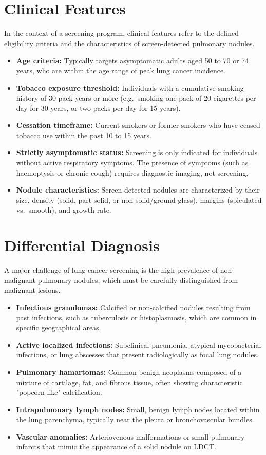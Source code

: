 \section*{Clinical Features}
In the context of a screening program, clinical features refer to the defined eligibility criteria and the characteristics of screen-detected pulmonary nodules.
\begin{itemize}
    \item \textbf{Age criteria:} Typically targets asymptomatic adults aged 50 to 70 or 74 years, who are within the age range of peak lung cancer incidence.
    \item \textbf{Tobacco exposure threshold:} Individuals with a cumulative smoking history of 30 pack-years or more (e.g.\ smoking one pack of 20 cigarettes per day for 30 years, or two packs per day for 15 years).
    \item \textbf{Cessation timeframe:} Current smokers or former smokers who have ceased tobacco use within the past 10 to 15 years.
    \item \textbf{Strictly asymptomatic status:} Screening is only indicated for individuals without active respiratory symptoms. The presence of symptoms (such as haemoptysis or chronic cough) requires diagnostic imaging, not screening.
    \item \textbf{Nodule characteristics:} Screen-detected nodules are characterized by their size, density (solid, part-solid, or non-solid/ground-glass), margins (spiculated vs.\ smooth), and growth rate.
\end{itemize}

\section*{Differential Diagnosis}
A major challenge of lung cancer screening is the high prevalence of non-malignant pulmonary nodules, which must be carefully distinguished from malignant lesions.
\begin{itemize}
    \item \textbf{Infectious granulomas:} Calcified or non-calcified nodules resulting from past infections, such as tuberculosis or histoplasmosis, which are common in specific geographical areas.
    \item \textbf{Active localized infections:} Subclinical pneumonia, atypical mycobacterial infections, or lung abscesses that present radiologically as focal lung nodules.
    \item \textbf{Pulmonary hamartomas:} Common benign neoplasms composed of a mixture of cartilage, fat, and fibrous tissue, often showing characteristic "popcorn-like" calcification.
    \item \textbf{Intrapulmonary lymph nodes:} Small, benign lymph nodes located within the lung parenchyma, typically near the pleura or bronchovascular bundles.
    \item \textbf{Vascular anomalies:} Arteriovenous malformations or small pulmonary infarcts that mimic the appearance of a solid nodule on LDCT.
\end{itemize}

